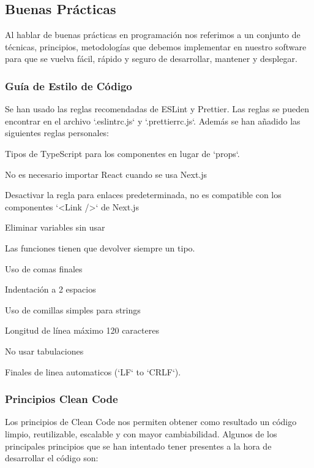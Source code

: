 \documentclass[12pt,twoside,titlepage]{report}
\begin{document}
\subsection{Buenas Prácticas}

Al hablar de buenas prácticas en programación nos referimos a un conjunto de técnicas, principios, metodologías que debemos implementar en nuestro software para que se vuelva fácil, rápido y seguro de desarrollar, mantener y desplegar.

\subsubsection{Guía de Estilo de Código}

Se han usado las reglas recomendadas de ESLint y Prettier. Las reglas se pueden encontrar en el archivo `.eslintrc.js` y `.prettierrc.js`. Además se han añadido las siguientes reglas personales:

\begin{compactitem}
    \item Tipos de TypeScript para los componentes en lugar de `props`.
    \item No es necesario importar React cuando se usa Next.js
    \item Desactivar la regla para enlaces predeterminada, no es compatible con los componentes `<Link />` de Next.js
    \item Eliminar variables sin usar
    \item Las funciones tienen que devolver siempre un tipo.
    \item Uso de comas finales
    \item Indentación a 2 espacios
    \item Uso de comillas simples para strings
    \item Longitud de línea máximo 120 caracteres
    \item No usar tabulaciones
    \item Finales de linea automaticos (`LF` to `CRLF`).
\end{compactitem}

\subsubsection{Principios Clean Code}

Los principios de Clean Code nos permiten obtener como resultado un código limpio, reutilizable, escalable y con mayor cambiabilidad. Algunos de los principales principios que se han intentado tener presentes a la hora de desarrollar el código son:
\end{document}
